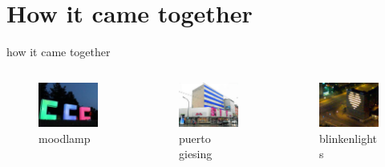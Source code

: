 \documentclass{beamer}
\begin{document}
\section{How it came together}
\begin{frame}{how it came together}

\begin{columns}%
\begin{column}{3.5cm}
        \begin{figure}
          \begin{center}
          \includegraphics[width=3cm]{bilder/ddc_har.jpg}
          \caption{moodlamp}
          \end{center}
        \end{figure}
\end{column}
\begin{column}{3.5cm}
        \begin{figure}
          \begin{center}
          \includegraphics[width=3cm]{bilder/hertie.jpg}
          \caption{puerto giesing}
          \end{center}
        \end{figure}
\end{column}
\begin{column}{3.5cm}
        \begin{figure}
          \begin{center}
          \includegraphics[width=3cm]{bilder/blinkenlights.jpg}
          \caption{blinkenlights}

\end{center}
\end{figure}
\end{column}
\end{columns}
\end{frame}
\end{document}
